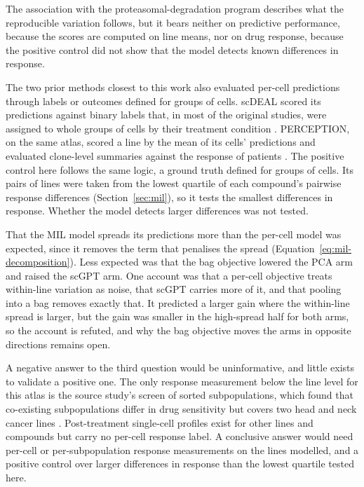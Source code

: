 The association with the proteasomal-degradation program describes what the reproducible variation
follows, but it bears neither on predictive performance, because the scores are computed on line means,
nor on drug response, because the positive control did not show that the model detects known
differences in response.

The two prior methods closest to this work also evaluated
per-cell predictions through labels or outcomes defined for groups of cells. scDEAL scored its
predictions against binary labels that, in most of the original studies, were assigned to whole groups
of cells by their treatment condition \cite{scdeal}. PERCEPTION, on the same atlas, scored a line by the
mean of its cells' predictions and evaluated clone-level summaries against the response of patients
\cite{perception}. The positive control here follows the same logic, a ground truth defined for groups
of cells. Its pairs of lines were taken from the lowest quartile of each compound's pairwise response
differences (Section~\ref{sec:mil}), so it tests the smallest differences in response. Whether the
model detects larger differences was not tested.

That the MIL model spreads its predictions more than the per-cell model was expected, since it removes
the term that penalises the spread (Equation~\ref{eq:mil-decomposition}). Less expected was that the bag
objective lowered the PCA arm and raised the scGPT arm. One account was that a per-cell objective treats
within-line variation as noise, that scGPT carries more of it, and that pooling into a bag removes
exactly that. It predicted a larger gain where the within-line spread is larger, but the gain was
smaller in the high-spread half for both arms, so the account is refuted, and why the bag objective moves
the arms in opposite directions remains open.

A negative answer to the third question would be uninformative, and little exists to validate a positive
one. The only response measurement below the line level for this atlas is the source study's screen of
sorted subpopulations, which found that co-existing subpopulations differ in drug sensitivity but covers
two head and neck cancer lines \cite{scp542}. Post-treatment single-cell profiles exist for other lines
and compounds \cite{srivatsan2020,tahoe100m} but carry no per-cell response label. A conclusive answer
would need per-cell or per-subpopulation response measurements on the lines modelled, and a positive
control over larger differences in response than the lowest quartile tested here.
